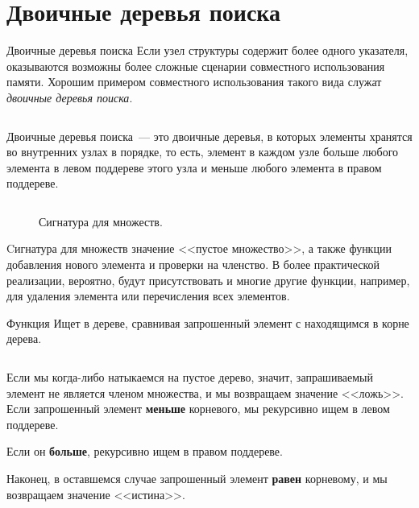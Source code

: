\section{Двоичные деревья поиска}
\label{sc:2.2}

\begin{frame}{Двоичные деревья поиска}
Если узел структуры содержит более одного указателя, оказываются
возможны более сложные сценарии совместного использования памяти. Хорошим примером
совместного использования такого вида служат \emph{двоичные деревья поиска}.

\inputminted[firstline=10, lastline=10] {haskell}{code/SearchTree.hs}

Двоичные деревья поиска~--- это двоичные деревья, в которых элементы
хранятся во внутренних узлах в 
порядке, то есть, элемент в каждом узле больше любого элемента в
левом поддереве этого узла и меньше любого элемента в правом
поддереве.
\end{frame}

\begin{frame}[fragile]{}
\begin{figure}[h]
  \centering
  \inputminted[firstline=12, lastline=15]{haskell}{code/SearchTree.hs}
  \caption{Сигнатура для множеств.}
\label{fig:2.7}
\end{figure}

Cигнатура для множеств значение <<пустое множество>>, а также функции добавления
нового элемента и проверки на членство.  В более практической
реализации, вероятно, будут присутствовать и многие другие функции,
например, для удаления элемента или перечисления всех элементов.
\end{frame}

\begin{frame}[fragile]{Функция }
Ищет в дереве, сравнивая запрошенный элемент с находящимся в корне дерева. 
\inputminted[firstline=22, lastline=25] {haskell}{code/SearchTree.hs}


Если мы когда-либо натыкаемся на пустое дерево, значит,
запрашиваемый элемент не является членом множества, и мы возвращаем
значение <<ложь>>. \\

Если запрошенный элемент \textbf{меньше}
корневого, мы рекурсивно ищем в левом поддереве.

Если он \textbf{больше}, рекурсивно ищем в правом поддереве. 

Наконец, в оставшемся случае
запрошенный элемент \textbf{равен} корневому, и мы возвращаем значение
<<истина>>. 
\end{frame}

